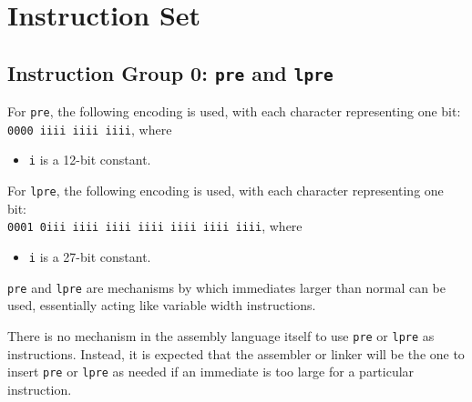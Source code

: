\documentclass{article}
\begin{document}

	\newpage
	\section{Instruction Set}

	\subsection{Instruction Group 0: \texttt{pre} and \texttt{lpre}}
	For \texttt{pre}, the following encoding is used, with each character
	representing one bit: \\
	\texttt{0000 iiii iiii iiii}, where 
	
	\singlespacing
	\begin{itemize}
	\item \texttt{i} is a 12-bit constant.
	\end{itemize}

	For \texttt{lpre}, the following encoding is used, with each character
	representing one bit: \\
	\texttt{0001 0iii iiii iiii  iiii iiii iiii iiii}, where

	\singlespacing
	\begin{itemize}
	\item \texttt{i} is a 27-bit constant.
	\end{itemize}

	\texttt{pre} and \texttt{lpre} are mechanisms by which immediates
	larger than normal can be used, essentially acting like variable width
	instructions.

	There is no mechanism in the assembly language itself to use
	\texttt{pre} or \texttt{lpre} as instructions. Instead, it is expected
	that the assembler or linker will be the one to insert \texttt{pre} or
	\texttt{lpre} as needed if an immediate is too large for a particular
	instruction.
\end{document}
